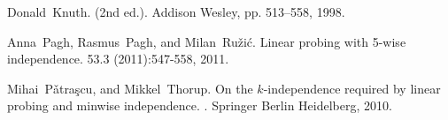 \documentclass[11pt]{article}
\begin{document}


\begin{thebibliography}{42}

Donald~Knuth.
 (2nd ed.).
\newblock Addison Wesley, pp. 513--558, 1998.


Anna~Pagh, Rasmus~Pagh, and Milan~Ru\v zi\'c.
\newblock Linear probing with 5-wise independence.
 53.3 (2011):547-558, 2011.

Mihai~P\v atra\c scu, and Mikkel~Thorup. 
\newblock On the $k$-independence required by linear probing and minwise independence.
. Springer Berlin Heidelberg, 2010.

\end{thebibliography}
\end{document}
